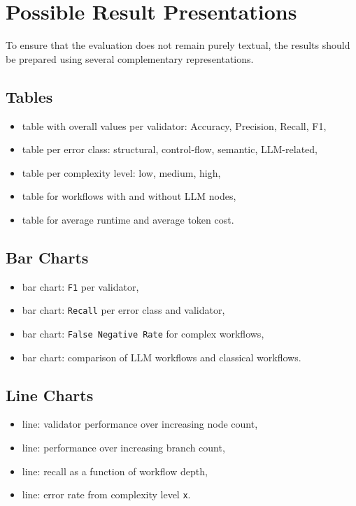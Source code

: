\documentclass[12pt,a4paper]{article}
\begin{document}
\section{Possible Result Presentations}

To ensure that the evaluation does not remain purely textual, the results should be prepared using several complementary representations.

\subsection{Tables}

\begin{itemize}
  \item table with overall values per validator: Accuracy, Precision, Recall, F1,
  \item table per error class: structural, control-flow, semantic, LLM-related,
  \item table per complexity level: low, medium, high,
  \item table for workflows with and without LLM nodes,
  \item table for average runtime and average token cost.
\end{itemize}

\subsection{Bar Charts}

\begin{itemize}
  \item bar chart: \texttt{F1} per validator,
  \item bar chart: \texttt{Recall} per error class and validator,
  \item bar chart: \texttt{False Negative Rate} for complex workflows,
  \item bar chart: comparison of LLM workflows and classical workflows.
\end{itemize}

\subsection{Line Charts}

\begin{itemize}
  \item line: validator performance over increasing node count,
  \item line: performance over increasing branch count,
  \item line: recall as a function of workflow depth,
  \item line: error rate from complexity level \texttt{x}.
\end{itemize}
\end{document}
